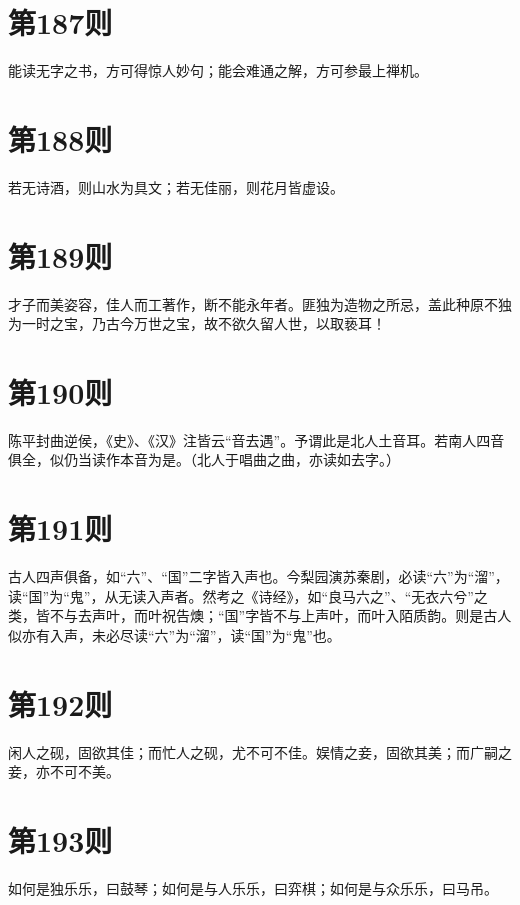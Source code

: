 \documentclass[12pt,a4paper]{ctexbook}
\begin{document}
\section{第187则}
能读无字之书，方可得惊人妙句；能会难通之解，方可参最上禅机。\par

\section{第188则}
若无诗酒，则山水为具文；若无佳丽，则花月皆虚设。\par

\section{第189则}
才子而美姿容，佳人而工著作，断不能永年者。匪独为造物之所忌，盖此种原不独为一时之宝，乃古今万世之宝，故不欲久留人世，以取亵耳！\par

\section{第190则}
陈平封曲逆侯，《史》、《汉》注皆云“音去遇”。予谓此是北人土音耳。若南人四音俱全，似仍当读作本音为是。（北人于唱曲之曲，亦读如去字。）\par

\section{第191则}
古人四声俱备，如“六”、“国”二字皆入声也。今梨园演苏秦剧，必读“六”为“溜”，读“国”为“鬼”，从无读入声者。然考之《诗经》，如“良马六之”、“无衣六兮”之类，皆不与去声叶，而叶祝告燠；“国”字皆不与上声叶，而叶入陌质韵。则是古人似亦有入声，未必尽读“六”为“溜”，读“国”为“鬼”也。\par

\section{第192则}
闲人之砚，固欲其佳；而忙人之砚，尤不可不佳。娱情之妾，固欲其美；而广嗣之妾，亦不可不美。\par

\section{第193则}
如何是独乐乐，曰鼓琴；如何是与人乐乐，曰弈棋；如何是与众乐乐，曰马吊。\par
\end{document}
